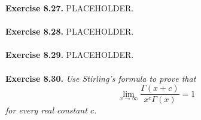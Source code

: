 \documentclass{article}
\begin{document}
\textbf{Exercise 8.27.}
PLACEHOLDER. \\\\






\textbf{Exercise 8.28.}
PLACEHOLDER. \\\\






\textbf{Exercise 8.29.}
PLACEHOLDER. \\\\






\textbf{Exercise 8.30.}
\emph{Use Stirling's formula to prove that
\[
  \lim_{x \to \infty} \frac{\Gamma(x+c)}{x^c \Gamma(x)} = 1
\]
for every real constant $c$.} \\
\end{document}
